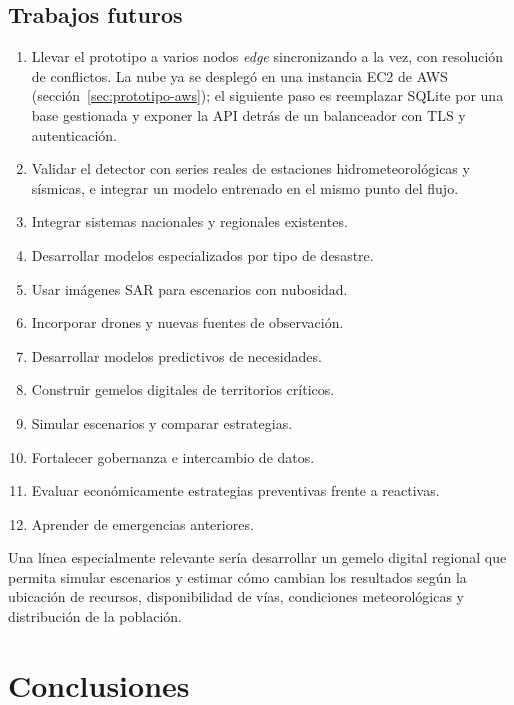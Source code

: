 \documentclass[11pt,a4paper]{article}
\begin{document}
\subsection{Trabajos futuros}

\begin{enumerate}[leftmargin=*]
  \item Llevar el prototipo a varios nodos \emph{edge} sincronizando a la vez,
        con resolución de conflictos. La nube ya se desplegó en una instancia
        EC2 de AWS (sección~\ref{sec:prototipo-aws}); el siguiente paso es
        reemplazar SQLite por una base gestionada y exponer la API detrás de
        un balanceador con TLS y autenticación.
  \item Validar el detector con series reales de estaciones hidrometeorológicas
        y sísmicas, e integrar un modelo entrenado en el mismo punto del flujo.
  \item Integrar sistemas nacionales y regionales existentes.
  \item Desarrollar modelos especializados por tipo de desastre.
  \item Usar imágenes SAR para escenarios con nubosidad.
  \item Incorporar drones y nuevas fuentes de observación.
  \item Desarrollar modelos predictivos de necesidades.
  \item Construir gemelos digitales de territorios críticos.
  \item Simular escenarios y comparar estrategias.
  \item Fortalecer gobernanza e intercambio de datos.
  \item Evaluar económicamente estrategias preventivas frente a reactivas.
  \item Aprender de emergencias anteriores.
\end{enumerate}

Una línea especialmente relevante sería desarrollar un gemelo digital regional
que permita simular escenarios y estimar cómo cambian los resultados según la
ubicación de recursos, disponibilidad de vías, condiciones meteorológicas y
distribución de la población.

\section{Conclusiones}
\end{document}
